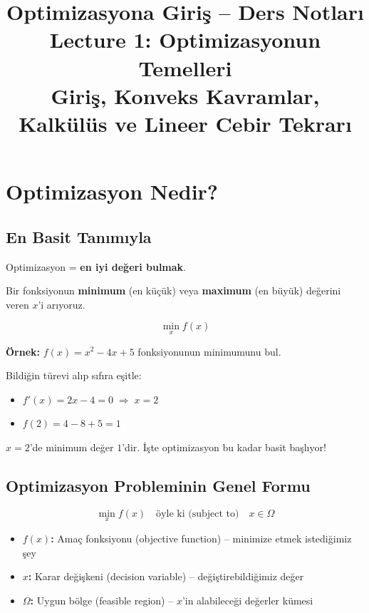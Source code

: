 \documentclass[12pt,a4paper]{article}
\title{
    \vspace{-1cm}
    {\LARGE \textbf{Optimizasyona Giri\c{s} -- Ders Notlar{\i}}} \\[0.5cm]
    {\Large Lecture 1: Optimizasyonun Temelleri} \\[0.3cm]
    {\large Giri\c{s}, Konveks Kavramlar, Kalk\"ul\"us ve Lineer Cebir Tekrar{\i}}
}
\author{}
\date{}
\theoremstyle{definition}
\theoremstyle{remark}
\begin{document}
\maketitle
\thispagestyle{fancy}

\tableofcontents
\newpage

\section{Optimizasyon Nedir?}

\subsection{En Basit Tan{\i}m{\i}yla}

Optimizasyon = \textbf{en iyi de\u{g}eri bulmak}.

Bir fonksiyonun \textbf{minimum} (en k\"u\c{c}\"uk) veya \textbf{maximum} (en b\"uy\"uk) de\u{g}erini veren $x$'i ar{\i}yoruz.

\[
\min_{x} f(x)
\]

\textbf{\"Ornek:} $f(x) = x^2 - 4x + 5$ fonksiyonunun minimumunu bul.

Bildi\u{g}in t\"urevi al{\i}p s{\i}f{\i}ra e\c{s}itle:
\begin{itemize}
    \item $f'(x) = 2x - 4 = 0 \;\Rightarrow\; x = 2$
    \item $f(2) = 4 - 8 + 5 = 1$
\end{itemize}

$x = 2$'de minimum de\u{g}er $1$'dir. \.{I}\c{s}te optimizasyon bu kadar basit ba\c{s}l{\i}yor!

\subsection{Optimizasyon Probleminin Genel Formu}

\[
\min_{x} f(x) \quad \text{\"oyle ki (subject to)} \quad x \in \Omega
\]

\begin{itemize}
    \item \textbf{$f(x)$:} Ama\c{c} fonksiyonu (objective function) -- minimize etmek istedi\u{g}imiz \c{s}ey
    \item \textbf{$x$:} Karar de\u{g}i\c{s}keni (decision variable) -- de\u{g}i\c{s}tirebildi\u{g}imiz de\u{g}er
    \item \textbf{$\Omega$:} Uygun b\"olge (feasible region) -- $x$'in alabilece\u{g}i de\u{g}erler k\"umesi
\end{itemize}
\end{document}
